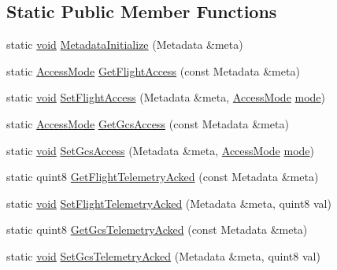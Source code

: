 \subsection*{Static Public Member Functions}
\begin{DoxyCompactItemize}
\item 
static \hyperlink{group___u_a_v_objects_plugin_ga444cf2ff3f0ecbe028adce838d373f5c}{void} \hyperlink{group___u_a_v_objects_plugin_ga0e0e6753710634f75bf5f27e0c3e073a}{Metadata\-Initialize} (Metadata \&meta)
\item 
static \hyperlink{group___u_a_v_objects_plugin_ga80357a2f38fa4be23200de86614c3d77}{Access\-Mode} \hyperlink{group___u_a_v_objects_plugin_ga98889e5102c4c2d2c9f1a47c03633218}{Get\-Flight\-Access} (const Metadata \&meta)
\item 
static \hyperlink{group___u_a_v_objects_plugin_ga444cf2ff3f0ecbe028adce838d373f5c}{void} \hyperlink{group___u_a_v_objects_plugin_gaa660f23e03de07c425e5162e2dc42c4f}{Set\-Flight\-Access} (Metadata \&meta, \hyperlink{group___u_a_v_objects_plugin_ga80357a2f38fa4be23200de86614c3d77}{Access\-Mode} \hyperlink{glext_8h_a1e71d9c196e4683cc06c4b54d53f7ef5}{mode})
\item 
static \hyperlink{group___u_a_v_objects_plugin_ga80357a2f38fa4be23200de86614c3d77}{Access\-Mode} \hyperlink{group___u_a_v_objects_plugin_ga7efd83f9d2ce75464022ed2e05c33920}{Get\-Gcs\-Access} (const Metadata \&meta)
\item 
static \hyperlink{group___u_a_v_objects_plugin_ga444cf2ff3f0ecbe028adce838d373f5c}{void} \hyperlink{group___u_a_v_objects_plugin_ga55ae4b0f44dc39c52da3d4173345c19b}{Set\-Gcs\-Access} (Metadata \&meta, \hyperlink{group___u_a_v_objects_plugin_ga80357a2f38fa4be23200de86614c3d77}{Access\-Mode} \hyperlink{glext_8h_a1e71d9c196e4683cc06c4b54d53f7ef5}{mode})
\item 
static quint8 \hyperlink{group___u_a_v_objects_plugin_ga98522650b206f948c9141115c15d1d13}{Get\-Flight\-Telemetry\-Acked} (const Metadata \&meta)
\item 
static \hyperlink{group___u_a_v_objects_plugin_ga444cf2ff3f0ecbe028adce838d373f5c}{void} \hyperlink{group___u_a_v_objects_plugin_ga92f2e8fef7adb87575582d52a4d90519}{Set\-Flight\-Telemetry\-Acked} (Metadata \&meta, quint8 val)
\item 
static quint8 \hyperlink{group___u_a_v_objects_plugin_ga3bfcc38f5830eeea1369a6e7c3aa3214}{Get\-Gcs\-Telemetry\-Acked} (const Metadata \&meta)
\item 
static \hyperlink{group___u_a_v_objects_plugin_ga444cf2ff3f0ecbe028adce838d373f5c}{void} \hyperlink{group___u_a_v_objects_plugin_ga190e264f603dd8ade6b6f9e84debfb4c}{Set\-Gcs\-Telemetry\-Acked} (Metadata \&meta, quint8 val)

\end{DoxyCompactItemize}
